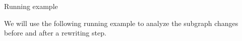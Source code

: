 \documentclass{beamer}
\newcommand{\graphbox}[8]{
  \begin{scope}[xshift=#2,yshift=#3]
    \draw [rounded corners=2mm] (0,0) rectangle (#4,-#5);
    \node at (0,0mm) [anchor=north west,inner sep=1mm] {#1};
    \begin{scope}[xshift=#4/2+#6,yshift=#7] 
    #8
    \end{scope}
  \end{scope}
}
\begin{document}
\begin{frame}{Running example}

    We will use the following running example to analyze the subgraph changes before and after a rewriting step.


                    

\end{frame}
\end{document}
